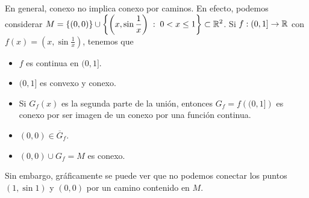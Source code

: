 \begin{eg}
	En general, conexo no implica conexo por caminos. En efecto, podemos considerar $\displaystyle M = \left\{ \left(0,0\right)\right\} \cup \left\{ \left(x,\sin \frac{1}{x}\right) \; : \; 0 < x \leq 1\right\} \subset \mathbb{R}^{2} $. Si $\displaystyle f : (0,1] \to \mathbb{R} $ con $\displaystyle f\left(x\right) = \left(x,\sin \frac{1}{x}\right) $, tenemos que
	\begin{itemize}
		\item $\displaystyle f $ es continua en $\displaystyle (0,1] $.
		\item $\displaystyle (0,1] $ es convexo y conexo.
		\item Si $\displaystyle G_{f}\left(x\right) $ es la segunda parte de la unión, entonces $\displaystyle G_{f} = f\left((0,1]\right) $ es conexo por ser imagen de un conexo por una función continua.
		\item $\displaystyle \left(0,0\right) \in \overline{G}_{f} $.
		\item $\displaystyle \left(0,0\right)\cup G_{f} = M $ es conexo.
	\end{itemize}
	Sin embargo, gráficamente se puede ver que no podemos conectar los puntos $\displaystyle \left(1,\sin 1\right) $ y $\displaystyle \left(0,0\right) $ por un camino contenido en $\displaystyle M $.
\end{eg}
